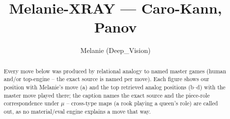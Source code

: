 \documentclass[11pt]{article}
\title{Melanie-XRAY — Caro-Kann, Panov}
\author{Melanie (Deep\_Vision)}
\date{}
\begin{document}
\maketitle

\begin{abstract}Every move below was produced by relational analogy to named master games (human and/or top-engine -- the exact source is named per move). Each figure shows our position with Melanie's move (a) and the top retrieved analog positions (b--d) with the master move played there; the caption names the exact source and the piece-role correspondence under $\mu$ -- cross-type maps (a rook playing a queen's role) are called out, as no material/eval engine explains a move that way.\end{abstract}

\begin{figure}[p]\centering
\begin{subfigure}{0.46\textwidth}\centering
\resizebox{\linewidth}{!}{%
\newchessgame
\chessboard[
  setfen={rnbqk2r/pp2bppp/4pn2/3p4/2PP4/2N2N2/PP3PPP/R1BQKB1R w KQkq - 2 7},
  showmover=false,
  pgfstyle=straightmove, color=movearrow, markmove={c4-c5}
]}
\caption{}
\end{subfigure}\hfill
\begin{subfigure}{0.46\textwidth}\centering
\resizebox{\linewidth}{!}{%
\newchessgame
\chessboard[
  setfen={r1bqkb1r/pp3ppp/2n1pn2/3p4/2PP4/2N2N2/PP3PPP/R1BQKB1R w KQkq - 0 7},
  showmover=false,
  pgfstyle=straightmove, color=movearrow, markmove={c4-c5}
]}
\caption{}
\end{subfigure}
\\[4pt]
\begin{subfigure}{0.46\textwidth}\centering
\resizebox{\linewidth}{!}{%
\newchessgame
\chessboard[
  setfen={r1bqkb1r/pp3ppp/2n1pn2/3p4/2PP4/2N2N2/PP3PPP/R1BQKB1R w KQkq - 0 7},
  showmover=false,
  pgfstyle=straightmove, color=movearrow, markmove={c4-c5}
]}
\caption{}
\end{subfigure}\hfill
\begin{subfigure}{0.46\textwidth}\centering
\resizebox{\linewidth}{!}{%
\newchessgame
\chessboard[
  setfen={r1bqkb1r/pp3ppp/2n1pn2/3p4/2PP4/2N2N2/PP3PPP/R1BQKB1R w KQkq - 0 7},
  showmover=false,
  pgfstyle=straightmove, color=movearrow, markmove={c4-c5}
]}
\caption{}
\end{subfigure}

\end{figure}
\end{document}
